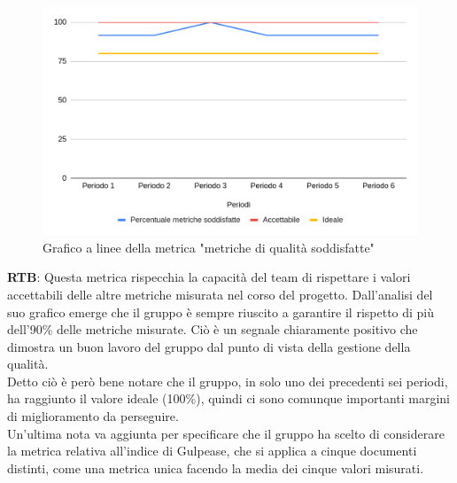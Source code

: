 \documentclass[10pt]{article}
\begin{document}
\begin{justify}
\begin{figure}[H]
  \centering
  \includegraphics[width=0.9\linewidth]{metricheRispettate.png}
  \caption{Grafico a linee della metrica "metriche di qualità soddisfatte"}
  \label{fig:metricheRispettate_chart}
\end{figure}

\textbf{RTB}: Questa metrica rispecchia la capacità del team di rispettare i valori accettabili delle altre metriche misurata nel corso del progetto. Dall'analisi del suo 
grafico emerge che il gruppo è sempre riuscito a garantire il rispetto di più dell'90\% delle metriche misurate. Ciò è un segnale chiaramente positivo che dimostra
un buon lavoro del gruppo dal punto di vista della gestione della qualità.\\
Detto ciò è però bene notare che il gruppo, in solo uno dei precedenti sei periodi, ha raggiunto il valore ideale (100\%), quindi ci sono comunque importanti margini
di miglioramento da perseguire.\\
Un'ultima nota va aggiunta per specificare che il gruppo ha scelto di considerare la metrica relativa all'indice di Gulpease, che si applica a cinque documenti distinti, come 
una metrica unica facendo la media dei cinque valori misurati.\\



\end{justify}
\end{document}
